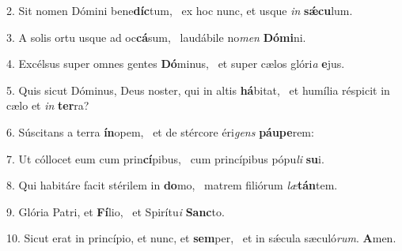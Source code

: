 2. Sit nomen Dómini bene\textbf{díc}tum, \ast\  ex hoc nunc, et usque \textit{in} \textbf{sǽ}\textbf{cu}lum.\

3. A solis ortu usque ad oc\textbf{cá}sum, \ast\  laudábile no\textit{men} \textbf{Dó}\textbf{mi}ni.\

4. Excélsus super omnes gentes \textbf{Dó}minus, \ast\  et super cælos glóri\textit{a} \textbf{e}jus.\

5. Quis sicut Dóminus, Deus noster, qui in altis \textbf{há}bitat, \ast\  et humília réspicit in cælo et \textit{in} \textbf{ter}ra?\

6. Súscitans a terra \textbf{ín}opem, \ast\  et de stércore éri\textit{gens} \textbf{páu}\textbf{pe}rem:\

7. Ut cóllocet eum cum prin\textbf{cí}pibus, \ast\  cum princípibus pópu\textit{li} \textbf{su}i.\

8. Qui habitáre facit stérilem in \textbf{do}mo, \ast\  matrem filiórum \textit{læ}\textbf{tán}tem.\

9. Glória Patri, et \textbf{Fí}lio, \ast\  et Spirítu\textit{i} \textbf{Sanc}to.\

10. Sicut erat in princípio, et nunc, et \textbf{sem}per, \ast\  et in sǽcula sæculó\textit{rum}. \textbf{A}men.\

